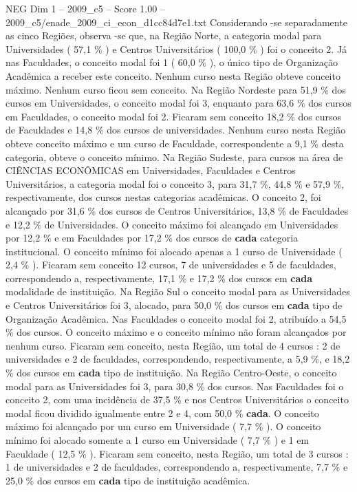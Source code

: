 \begin{textsample}{NEG Dim 1 – 2009\_c5 – Score 1.00 – 2009\_c5/enade\_2009\_ci\_econ\_d1cc84d7e1.txt}
Considerando -se separadamente as cinco Regiões, observa -se que, na Região Norte, a categoria modal para Universidades ( 57,1 \% ) e Centros Universitários ( 100,0 \% ) foi o conceito 2.
Já nas Faculdades, o conceito modal foi 1 ( 60,0 \% ), o único tipo de Organização Acadêmica a receber este conceito.
Nenhum curso nesta Região obteve conceito máximo.
Nenhum curso ficou sem conceito.
Na Região Nordeste para 51,9 \% dos cursos em Universidades, o conceito modal foi 3, enquanto para 63,6 \% dos cursos em Faculdades, o conceito modal foi 2.
Ficaram sem conceito 18,2 \% dos cursos de Faculdades e 14,8 \% dos cursos de universidades.
Nenhum curso nesta Região obteve conceito máximo e um curso de Faculdade, correspondente a 9,1 \% desta categoria, obteve o conceito mínimo.
Na Região Sudeste, para cursos na área de CIÊNCIAS ECONÔMICAS em Universidades, Faculdades e Centros Universitários, a categoria modal foi o conceito 3, para 31,7 \%, 44,8 \% e 57,9 \%, respectivamente, dos cursos nestas categorias acadêmicas.
O conceito 2, foi alcançado por 31,6 \% dos cursos de Centros Universitários, 13,8 \% de Faculdades e 12,2 \% de Universidades.
O conceito máximo foi alcançado em Universidades por 12,2 \% e em Faculdades por 17,2 \% dos cursos de \textbf{cada} categoria institucional.
O conceito mínimo foi alocado apenas a 1 curso de Universidade ( 2,4 \% ).
Ficaram sem conceito 12 cursos, 7 de universidades e 5 de faculdades, correspondendo a, respectivamente, 17,1 \% e 17,2 \% dos cursos em \textbf{cada} modalidade de instituição.
Na Região Sul o conceito modal para as Universidades e Centros Universitários foi 3, alocado, para 50,0 \% dos cursos em \textbf{cada} tipo de Organização Acadêmica.
Nas Faculdades o conceito modal foi 2, atribuído a 54,5 \% dos cursos.
O conceito máximo e o conceito mínimo não foram alcançados por nenhum curso.
Ficaram sem conceito, nesta Região, um total de 4 cursos : 2 de universidades e 2 de faculdades, correspondendo, respectivamente, a 5,9 \%, e 18,2 \% dos cursos em \textbf{cada} tipo de instituição.
Na Região Centro-Oeste, o conceito modal para as Universidades foi 3, para 30,8 \% dos cursos.
Nas Faculdades foi o conceito 2, com uma incidência de 37,5 \% e nos Centros Universitários o conceito modal ficou dividido igualmente entre 2 e 4, com 50,0 \% \textbf{cada}.
O conceito máximo foi alcançado por um curso em Universidade ( 7,7 \% ).
O conceito mínimo foi alocado somente a 1 curso em Universidade ( 7,7 \% ) e 1 em Faculdade ( 12,5 \% ).
Ficaram sem conceito, nesta Região, um total de 3 cursos : 1 de universidades e 2 de faculdades, correspondendo a, respectivamente, 7,7 \% e 25,0 \% dos cursos em \textbf{cada} tipo de instituição acadêmica.

\end{textsample}
